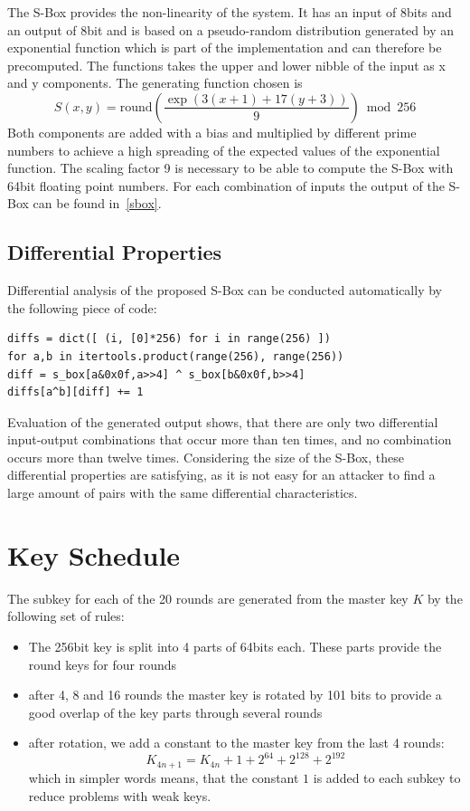 \documentclass[a4paper]{article}
\begin{document}
    The S-Box provides the non-linearity of the system. It has an input of 8bits and an output of 8bit and is based on a pseudo-random distribution generated by an exponential function which is part of the implementation and can therefore be precomputed. The functions takes the upper and lower nibble of the input as x and y components. The generating function chosen is
$$
S(x,y) = \mathrm{round} \left( \frac{\exp \left(3(x+1) + 17(y+3)\right)}{9} \right) \bmod 256
$$
Both components are added with a bias and multiplied by different prime numbers to achieve a high spreading of the expected values of the exponential function. The scaling factor 9 is necessary to be able to compute the S-Box with 64bit floating point numbers. For each combination of inputs the output of the S-Box can be found in~\ref{sbox}.
\subsection{Differential Properties}
Differential analysis of the proposed S-Box can be conducted automatically by the following piece of code:
\begin{lstlisting}
diffs = dict([ (i, [0]*256) for i in range(256) ])
for a,b in itertools.product(range(256), range(256))
diff = s_box[a&0x0f,a>>4] ^ s_box[b&0x0f,b>>4]
diffs[a^b][diff] += 1
\end{lstlisting}
Evaluation of the generated output shows, that there are only two differential input-output combinations that occur more than ten times, and no combination occurs more than twelve times. Considering the size of the S-Box, these differential properties are satisfying, as it is not easy for an attacker to find a large amount of pairs with the same differential characteristics.
\section{Key Schedule}
The subkey for each of the 20 rounds are generated from the master key $K$ by the following set of rules:
\begin{itemize}
    \item The 256bit key is split into 4 parts of 64bits each. These parts provide the round keys for four rounds
    \item after 4, 8 and 16 rounds the master key is rotated by 101 bits to provide a good overlap of the key parts through several rounds
    \item after rotation, we add a constant to the master key from the last 4 rounds: $$K_{4n+1} = K_{4n} + 1 + 2^{64} + 2^{128} + 2^{192}$$ which in simpler words means, that the constant $1$ is added to each subkey to reduce problems with weak keys.
\end{itemize}
\end{document}
